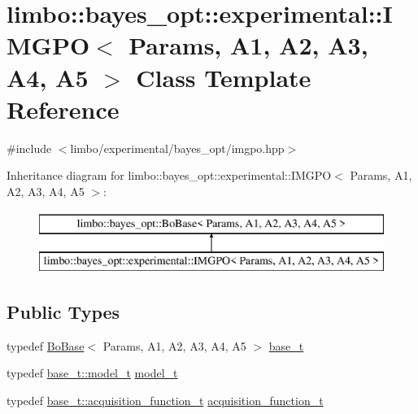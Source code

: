 \hypertarget{classlimbo_1_1bayes__opt_1_1experimental_1_1_i_m_g_p_o}{}\section{limbo\+:\+:bayes\+\_\+opt\+:\+:experimental\+:\+:I\+M\+G\+P\+O$<$ Params, A1, A2, A3, A4, A5 $>$ Class Template Reference}
\label{classlimbo_1_1bayes__opt_1_1experimental_1_1_i_m_g_p_o}


{\ttfamily \#include $<$limbo/experimental/bayes\+\_\+opt/imgpo.\+hpp$>$}

Inheritance diagram for limbo\+:\+:bayes\+\_\+opt\+:\+:experimental\+:\+:I\+M\+G\+P\+O$<$ Params, A1, A2, A3, A4, A5 $>$\+:\begin{figure}[H]
\begin{center}
\leavevmode
\includegraphics[height=2.000000cm]{classlimbo_1_1bayes__opt_1_1experimental_1_1_i_m_g_p_o}
\end{center}
\end{figure}
\subsection*{Public Types}
\begin{DoxyCompactItemize}
\item 
typedef \hyperlink{classlimbo_1_1bayes__opt_1_1_bo_base}{Bo\+Base}$<$ Params, A1, A2, A3, A4, A5 $>$ \hyperlink{classlimbo_1_1bayes__opt_1_1experimental_1_1_i_m_g_p_o_a08e12049587eed6be7bc86f05da043f0}{base\+\_\+t}
\item 
typedef \hyperlink{classlimbo_1_1bayes__opt_1_1_bo_base_a151af5c7eef92a82d8813bb2e067d267}{base\+\_\+t\+::model\+\_\+t} \hyperlink{classlimbo_1_1bayes__opt_1_1experimental_1_1_i_m_g_p_o_a2a2958dccaec1f7f1b21a2d4c85cf1fc}{model\+\_\+t}
\item 
typedef \hyperlink{classlimbo_1_1bayes__opt_1_1_bo_base_a200a43abb6c95d2d99660898b36f2200}{base\+\_\+t\+::acquisition\+\_\+function\+\_\+t} \hyperlink{classlimbo_1_1bayes__opt_1_1experimental_1_1_i_m_g_p_o_af7f26bfe0e3119ce147088e9e8fbfc17}{acquisition\+\_\+function\+\_\+t}
\end{DoxyCompactItemize}

